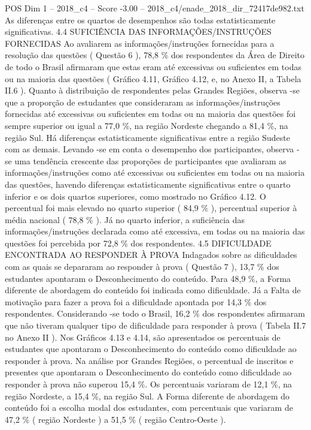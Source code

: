 \begin{textsample}{POS Dim 1 – 2018\_c4 – Score -3.00 – 2018\_c4/enade\_2018\_dir\_72417de982.txt}
As diferenças entre os quartos de desempenhos são todas estatisticamente significativas. 4.4 SUFICIÊNCIA DAS INFORMAÇÕES/INSTRUÇÕES FORNECIDAS Ao avaliarem as informações/instruções fornecidas para a resolução das questões ( Questão 6 ), 78,8 \% dos respondentes da Área de Direito de todo o Brasil afirmaram que estas eram até excessivas ou suficientes em todas ou na maioria das questões ( Gráfico 4.11, Gráfico 4.12, e, no Anexo II, a Tabela II.6 ).
Quanto à distribuição de respondentes pelas Grandes Regiões, observa -se que a proporção de estudantes que consideraram as informações/instruções fornecidas até excessivas ou suficientes em todas ou na maioria das questões foi sempre superior ou igual a 77,0 \%, na região Nordeste chegando a 81,4 \%, na região Sul.
Há diferenças estatisticamente significativas entre a região Sudeste com as demais.
Levando -se em conta o desempenho dos participantes, observa -se uma tendência crescente das proporções de participantes que avaliaram as informações/instruções como até excessivas ou suficientes em todas ou na maioria das questões, havendo diferenças estatisticamente significativas entre o quarto inferior e os dois quartos superiores, como mostrado no Gráfico 4.12.
O percentual foi mais elevado no quarto superior ( 84,9 \% ), percentual superior à média nacional ( 78,8 \% ).
Já no quarto inferior, a suficiência das informações/instruções declarada como até excessiva, em todas ou na maioria das questões foi percebida por 72,8 \% dos respondentes. 4.5 DIFICULDADE ENCONTRADA AO RESPONDER À PROVA Indagados sobre as dificuldades com as quais se depararam ao responder à prova ( Questão 7 ), 13,7 \% dos estudantes apontaram o Desconhecimento do conteúdo.
Para 48,9 \%, a Forma diferente de abordagem do conteúdo foi indicada como dificuldade.
Já a Falta de motivação para fazer a prova foi a dificuldade apontada por 14,3 \% dos respondentes.
Considerando -se todo o Brasil, 16,2 \% dos respondentes afirmaram que não tiveram qualquer tipo de dificuldade para responder à prova ( Tabela II.7 no Anexo II ).
Nos Gráficos 4.13 e 4.14, são apresentados os percentuais de estudantes que apontaram o Desconhecimento do conteúdo como dificuldade ao responder à prova.
Na análise por Grandes Regiões, o percentual de inscritos e presentes que apontaram o Desconhecimento do conteúdo como dificuldade ao responder à prova não superou 15,4 \%.
Os percentuais variaram de 12,1 \%, na região Nordeste, a 15,4 \%, na região Sul.
A Forma diferente de abordagem do conteúdo foi a escolha modal dos estudantes, com percentuais que variaram de 47,2 \% ( região Nordeste ) a 51,5 \% ( região Centro-Oeste ).

\end{textsample}
